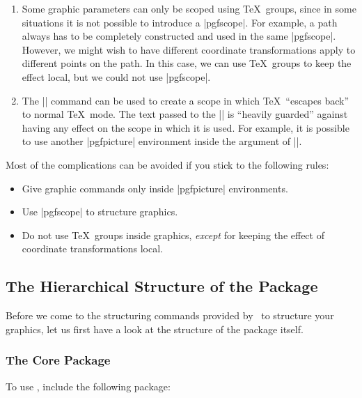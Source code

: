 \begin{enumerate}
        Since every |{pgfscope}| automatically creates a \TeX\ group, all
        graphic parameters that are local to the current \TeX\ group are also
        local to the current |{pgfscope}|.
    \item Some graphic parameters can only be scoped using \TeX\ groups, since
        in some situations it is not possible to introduce a |{pgfscope}|. For
        example, a path always has to be completely constructed and used in the
        same |{pgfscope}|. However, we might wish to have different coordinate
        transformations apply to different points on the path. In this case, we
        can use \TeX\ groups to keep the effect local, but we could not use
        |{pgfscope}|.
    \item The |\pgftext| command can be used to create a scope in which \TeX\
        ``escapes back'' to normal \TeX\ mode. The text passed to the
        |\pgftext| is ``heavily guarded'' against having any effect on the
        scope in which it is used. For example, it is possible to use another
        |{pgfpicture}| environment inside the argument of |\pgftext|.
\end{enumerate}

Most of the complications can be avoided if you stick to the following
rules:
%
\begin{itemize}
    \item Give graphic commands only inside |{pgfpicture}| environments.
    \item Use |{pgfscope}| to structure graphics.
    \item Do not use \TeX\ groups inside graphics, \emph{except} for keeping
        the effect of coordinate transformations local.
\end{itemize}


\subsection{The Hierarchical Structure of the Package}

Before we come to the structuring commands provided by \pgfname\ to structure
your graphics, let us first have a look at the structure of the package itself.


\subsubsection{The Core Package}

To use \pgfname, include the following package:

